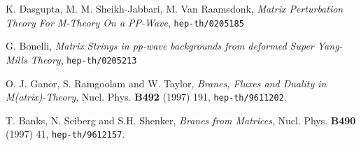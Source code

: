 \documentclass[a4paper,11pt]{article}
\begin{document}
\begin{thebibliography}{99}
K. Dasgupta, M. M. Sheikh-Jabbari, M. Van Raamsdonk, 
{\it Matrix Perturbation Theory For M-Theory On a PP-Wave},
{\tt hep-th/0205185}

G. Bonelli, 
{\it Matrix Strings in pp-wave backgrounds from deformed Super Yang-Mills Theory},
{\tt hep-th/0205213}

O. J. Ganor, S. Ramgoolam and W. Taylor, {\it Branes, Fluxes and Duality in M(atrix)-Theory},
Nucl. Phys. {\bf B492} (1997) 191, {\tt hep-th/9611202}.

T. Banks, N. Seiberg and S.H. Shenker,
{\it Branes from Matrices},
Nucl. Phys. {\bf B490} (1997) 41, {\tt hep-th/9612157}.

\end{thebibliography}

\end{document}
